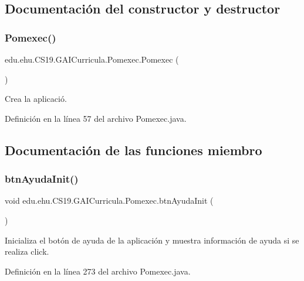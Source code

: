 \subsection{Documentación del constructor y destructor}
\mbox{\label{a00028_a8de2bd06d0893d4f24ef2bd8216467cf}} 
\subsubsection{\texorpdfstring{Pomexec()}{Pomexec()}}
{\footnotesize\ttfamily edu.\+ehu.\+C\+S19.\+G\+A\+I\+Curricula.\+Pomexec.\+Pomexec (\begin{DoxyParamCaption}{ }\end{DoxyParamCaption})}



Crea la aplicació. 



Definición en la línea 57 del archivo Pomexec.\+java.



\subsection{Documentación de las funciones miembro}
\mbox{\label{a00028_a0b62d43fe793951471585f524b8963f0}} 
\subsubsection{\texorpdfstring{btnAyudaInit()}{btnAyudaInit()}}
{\footnotesize\ttfamily void edu.\+ehu.\+C\+S19.\+G\+A\+I\+Curricula.\+Pomexec.\+btn\+Ayuda\+Init (\begin{DoxyParamCaption}{ }\end{DoxyParamCaption})}



Inicializa el botón de ayuda de la aplicación y muestra información de ayuda si se realiza click. 



Definición en la línea 273 del archivo Pomexec.\+java.

